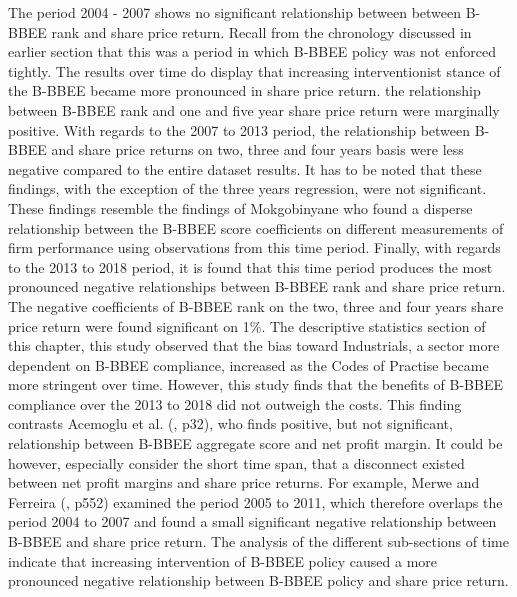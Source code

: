 The period 2004 - 2007 shows no significant relationship between between B-BBEE rank and share price return. Recall from the chronology discussed in earlier section that this was a period in which B-BBEE policy was not enforced tightly. The results over time do display that increasing interventionist stance of the B-BBEE became more pronounced in share price return. the relationship between B-BBEE rank and one and five year share price return were marginally positive. With regards to the 2007 to 2013 period, the relationship between B-BBEE and share price returns on two, three and four years basis were less negative compared to the entire dataset results. It has to be noted that these findings, with the exception of the three years regression, were not significant. These findings resemble the findings of Mokgobinyane who found a disperse relationship between the B-BBEE score coefficients on different measurements of firm performance using observations from this time period. Finally, with regards to the 2013 to 2018 period, it is found that this time period produces the most pronounced negative relationships between B-BBEE rank and share price return. The negative coefficients of B-BBEE rank on the two, three and four years share price return were found significant on 1\%. The descriptive statistics section of this chapter, this study observed that the bias toward Industrials, a sector more dependent on B-BBEE compliance, increased as the Codes of Practise became more stringent over time. However, this study finds that the benefits of B-BBEE compliance over the 2013 to 2018 did not outweigh the costs. This finding contrasts Acemoglu et al. (\citeyear{N23}, p32), who finds positive, but not significant, relationship between B-BBEE aggregate score and net profit margin. It could be however, especially consider the short time span, that a disconnect existed between net profit margins and share price returns. For example, Merwe and Ferreira (\citeyear{N7}, p552)  examined the period 2005 to 2011, which therefore overlaps the period 2004 to 2007 and found a small significant negative relationship between B-BBEE and share price return. The analysis of the different sub-sections of time indicate that increasing intervention of B-BBEE policy caused a more pronounced negative relationship between B-BBEE policy and share price return.
